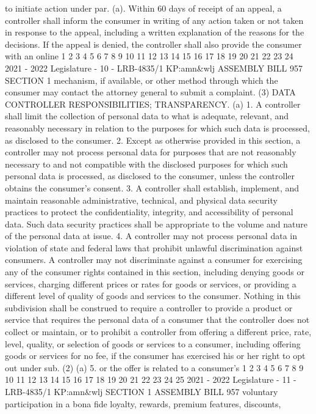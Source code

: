 to initiate action under par. (a). Within 60 days of receipt of an appeal, a controller
shall inform the consumer in writing of any action taken or not taken in response to
the appeal, including a written explanation of the reasons for the decisions. If the
appeal is denied, the controller shall also provide the consumer with an online
1
2
3
4
5
6
7
8
9
10
11
12
13
14
15
16
17
18
19
20
21
22
23
24
2021 - 2022 Legislature - 10 - LRB-4835/1
KP:amn&wlj
 ASSEMBLY BILL 957 SECTION 1
mechanism, if available, or other method through which the consumer may contact
the attorney general to submit a complaint.
(3) DATA CONTROLLER RESPONSIBILITIES; TRANSPARENCY. (a) 1. A controller shall
limit the collection of personal data to what is adequate, relevant, and reasonably
necessary in relation to the purposes for which such data is processed, as disclosed
to the consumer.
2. Except as otherwise provided in this section, a controller may not process
personal data for purposes that are not reasonably necessary to and not compatible
with the disclosed purposes for which such personal data is processed, as disclosed
to the consumer, unless the controller obtains the consumer's consent.
3. A controller shall establish, implement, and maintain reasonable
administrative, technical, and physical data security practices to protect the
confidentiality, integrity, and accessibility of personal data. Such data security
practices shall be appropriate to the volume and nature of the personal data at issue.
4. A controller may not process personal data in violation of state and federal
laws that prohibit unlawful discrimination against consumers. A controller may not
discriminate against a consumer for exercising any of the consumer rights contained
in this section, including denying goods or services, charging different prices or rates
for goods or services, or providing a different level of quality of goods and services to
the consumer. Nothing in this subdivision shall be construed to require a controller
to provide a product or service that requires the personal data of a consumer that the
controller does not collect or maintain, or to prohibit a controller from offering a
different price, rate, level, quality, or selection of goods or services to a consumer,
including offering goods or services for no fee, if the consumer has exercised his or
her right to opt out under sub. (2) (a) 5. or the offer is related to a consumer's
1
2
3
4
5
6
7
8
9
10
11
12
13
14
15
16
17
18
19
20
21
22
23
24
25
2021 - 2022 Legislature - 11 - LRB-4835/1
KP:amn&wlj
SECTION 1 ASSEMBLY BILL 957
voluntary participation in a bona fide loyalty, rewards, premium features, discounts,
